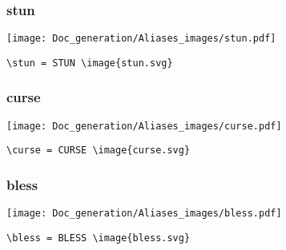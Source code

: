 \documentclass{article}
\begin{document}
\subsubsection{stun}
\begin{minipage}{0.45\linewidth}
\raggedright
\begin{spverbatim}
\stun 
\end{spverbatim}
\end{minipage}
\begin{minipage}{0.45\linewidth}
\raggedleft
\texttt{[image: Doc\_generation/Aliases\_images/stun.pdf]}
\end{minipage}
\begin{center}
\begin{BVerbatim}
\stun = STUN \image{stun.svg}
\end{BVerbatim}
\end{center}

\subsubsection{curse}
\begin{minipage}{0.45\linewidth}
\raggedright
\begin{spverbatim}
\curse 
\end{spverbatim}
\end{minipage}
\begin{minipage}{0.45\linewidth}
\raggedleft
\texttt{[image: Doc\_generation/Aliases\_images/curse.pdf]}
\end{minipage}
\begin{center}
\begin{BVerbatim}
\curse = CURSE \image{curse.svg}
\end{BVerbatim}
\end{center}

\subsubsection{bless}
\begin{minipage}{0.45\linewidth}
\raggedright
\begin{spverbatim}
\bless 
\end{spverbatim}
\end{minipage}
\begin{minipage}{0.45\linewidth}
\raggedleft
\texttt{[image: Doc\_generation/Aliases\_images/bless.pdf]}
\end{minipage}
\begin{center}
\begin{BVerbatim}
\bless = BLESS \image{bless.svg}
\end{BVerbatim}
\end{center}
\end{document}
